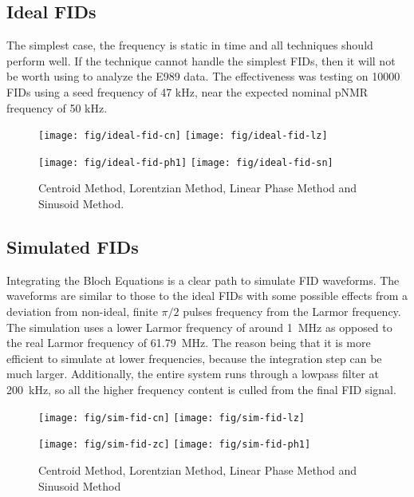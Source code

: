 \subsection{Ideal FIDs}
The simplest case, the frequency is static in time and all techniques should perform well.  If the technique cannot handle the simplest FIDs, then it will not be worth using to analyze the E989 data.  The effectiveness was testing on 10000 FIDs using a seed frequency of 47 kHz, near the expected nominal pNMR frequency of 50 kHz.  

\begin{figure}
    \label{fig:fid-ideal-freq-extraction}
    \texttt{[image: fig/ideal-fid-cn]}
    \texttt{[image: fig/ideal-fid-lz]}

    \texttt{[image: fig/ideal-fid-ph1]}
    \texttt{[image: fig/ideal-fid-sn]}
    \caption{Centroid Method, Lorentzian Method, Linear Phase Method and Sinusoid Method. }
\end{figure}

\subsection{Simulated FIDs}
Integrating the Bloch Equations is a clear path to simulate FID waveforms.  The waveforms are similar to those to the ideal FIDs with some possible effects from a deviation from non-ideal, finite $\pi/2$ pulses frequency from the Larmor frequency.  The simulation uses a lower Larmor frequency of around \SI{1}{\MHz} as opposed to the real Larmor frequency of \SI{61.79}{\MHz}.  The reason being that it is more efficient to simulate at lower frequencies, because the integration step can be much larger.  Additionally, the entire system runs through a lowpass filter at \SI{200}{\kHz}, so all the higher frequency content is culled from the final FID signal.

\begin{figure}
    \label{fig:fid-sim-freq-extraction}
    \texttt{[image: fig/sim-fid-cn]}
    \texttt{[image: fig/sim-fid-lz]}

    \texttt{[image: fig/sim-fid-zc]}
    \texttt{[image: fig/sim-fid-ph1]}
    \caption{Centroid Method, Lorentzian Method, Linear Phase Method and Sinusoid Method}
\end{figure}

